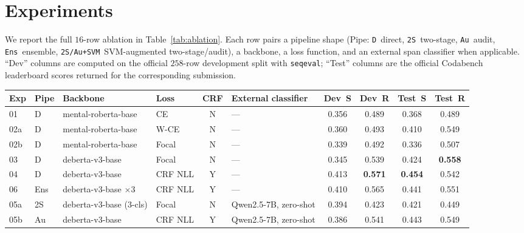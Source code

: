 \documentclass[11pt]{article}
\begin{document}
\section{Experiments}
\label{sec:experiments}

We report the full $16$-row ablation in
Table~\ref{tab:ablation}. Each row pairs a pipeline shape (Pipe:
\texttt{D}~direct, \texttt{2S}~two-stage, \texttt{Au}~audit,
\texttt{Ens}~ensemble, \texttt{2S/Au+SVM}~SVM-augmented
two-stage/audit), a backbone, a loss function, and an external span
classifier when applicable. ``Dev'' columns are computed on the
official $258$-row development split with \texttt{seqeval};
``Test'' columns are the official Codabench leaderboard scores
returned for the corresponding submission.

\begin{table}[!t]
\centering
\footnotesize
\setlength{\tabcolsep}{3.5pt}
\renewcommand{\arraystretch}{1.05}
\begin{tabular}{l l l l c l c c c c}
\toprule
\textbf{Exp} & \textbf{Pipe} & \textbf{Backbone} & \textbf{Loss}
& \textbf{CRF} & \textbf{External classifier}
& \textbf{Dev~S} & \textbf{Dev~R} & \textbf{Test~S} & \textbf{Test~R} \\
\midrule
01  & D    & mental-roberta-base        & CE      & N & ---                       & 0.356          & 0.489          & 0.368          & 0.489 \\
02a & D    & mental-roberta-base        & W-CE    & N & ---                       & 0.360          & 0.493          & 0.410          & 0.549 \\
02b & D    & mental-roberta-base        & Focal   & N & ---                       & 0.339          & 0.492          & 0.336          & 0.507 \\
03  & D    & deberta-v3-base            & Focal   & N & ---                       & 0.345          & 0.539          & 0.424          & \textbf{0.558} \\
04  & D    & deberta-v3-base            & CRF NLL & Y & ---                       & 0.413          & \textbf{0.571} & \textbf{0.454} & 0.542 \\
06  & Ens  & deberta-v3-base $\times 3$ & CRF NLL & Y & ---                       & 0.410          & 0.565          & 0.441          & 0.551 \\
\midrule
05a & 2S   & deberta-v3-base (3-cls)    & Focal   & N & Qwen2.5-7B, zero-shot     & 0.394          & 0.423          & 0.421          & 0.449 \\
05b & Au   & deberta-v3-base            & CRF NLL & Y & Qwen2.5-7B, zero-shot     & 0.386          & 0.541          & 0.443          & 0.549 \\

\end{tabular}
\end{table}
\end{document}
